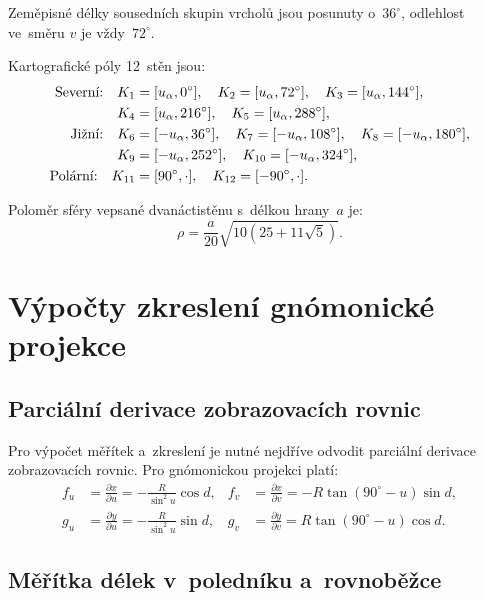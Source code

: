 \documentclass[11pt, a4paper]{article}
\begin{document}
Zeměpisné délky sousedních skupin vrcholů jsou posunuty o~$36^{\circ}$, odlehlost ve~směru $v$ je vždy~$72^{\circ}$.

Kartografické póly 12~stěn jsou:
\begin{align}
    \text{Severní:} \quad K_1 &= [u_\alpha, 0^{\circ}], \quad
    K_2 = [u_\alpha, 72^{\circ}], \quad
    K_3 = [u_\alpha, 144^{\circ}], \notag \\
    K_4 &= [u_\alpha, 216^{\circ}], \quad
    K_5 = [u_\alpha, 288^{\circ}], \\
    \text{Jižní:} \quad K_6 &= [-u_\alpha, 36^{\circ}], \quad
    K_7 = [-u_\alpha, 108^{\circ}], \quad
    K_8 = [-u_\alpha, 180^{\circ}], \notag \\
    K_9 &= [-u_\alpha, 252^{\circ}], \quad
    K_{10} = [-u_\alpha, 324^{\circ}], \\
    \text{Polární:} \quad K_{11} &= [90^{\circ}, \cdot], \quad
    K_{12} = [-90^{\circ}, \cdot].
\end{align}


Poloměr sféry vepsané dvanáctistěnu s~délkou hrany~$a$ je:
\begin{equation}
    \rho = \frac{a}{20} \sqrt{10(25 + 11\sqrt{5})}.
\end{equation}

\newpage

\section{Výpočty zkreslení gnómonické projekce}

\subsection{Parciální derivace zobrazovacích rovnic}

Pro výpočet měřítek a~zkreslení je nutné nejdříve odvodit parciální derivace zobrazovacích rovnic. Pro gnómonickou projekci platí:
\begin{align}
    f_u &= \frac{\partial x}{\partial u} = -\frac{R}{\sin^2 u} \cos d, &
    f_v &= \frac{\partial x}{\partial v} = -R \tan(90^{\circ} - u) \sin d, \\
    g_u &= \frac{\partial y}{\partial u} = -\frac{R}{\sin^2 u} \sin d, &
    g_v &= \frac{\partial y}{\partial v} = R \tan(90^{\circ} - u) \cos d.
\end{align}

\subsection{Měřítka délek v~poledníku a~rovnoběžce}
\end{document}
